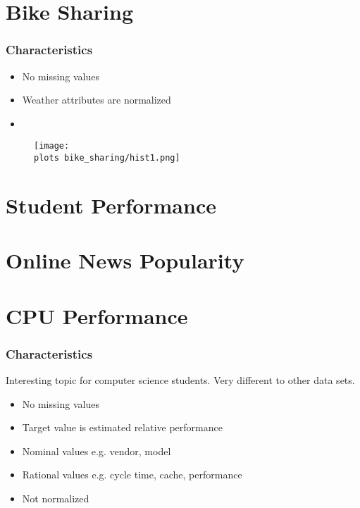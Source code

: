 \documentclass[aspectratio=169]{beamer}
\def \plots {./plots/}
\begin{document}
\section{Bike Sharing}

\begin{frame}{}
\frametitle{Characteristics}
\begin{itemize}
\item No missing values
\item Weather attributes are normalized
\item 
\end{itemize}
\end{frame}

\begin{frame}
    \begin{figure}
        \centering
        \texttt{[image: \\plots bike\_sharing/hist1.png]}
    \end{figure}
\end{frame}

\section{Student Performance}

\section{Online News Popularity}

\section{CPU Performance}

\begin{frame}{}
\frametitle{Characteristics}
Interesting topic for computer science students. Very different to other data sets.
\begin{itemize}
\item No missing values
\item Target value is estimated relative performance
\item Nominal values e.g. vendor, model
\item Rational values e.g. cycle time, cache, performance
\item Not normalized
\end{itemize}
\end{frame}
\end{document}
